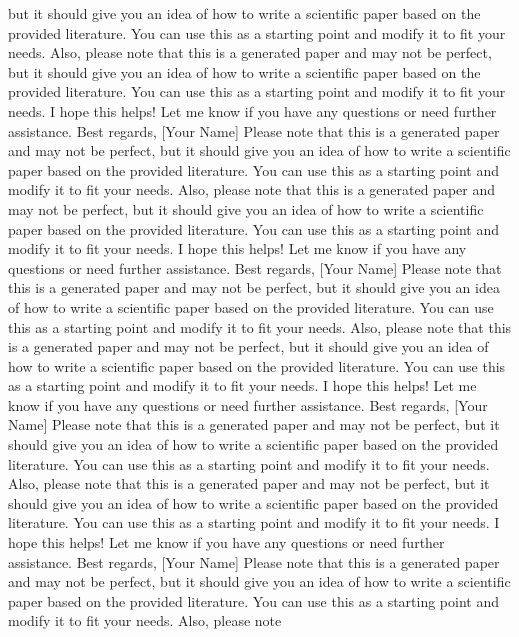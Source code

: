 \documentclass{article}
\begin{document}
but it should give you an idea of how to write a scientific paper based on the provided literature.  You can use this as a starting point and modify it to fit your needs.  Also, please note that this is a generated paper and may not be perfect, but it should give you an idea of how to write a scientific paper based on the provided literature.  You can use this as a starting point and modify it to fit your needs.  I hope this helps!  Let me know if you have any questions or need further assistance.  Best regards, [Your Name]  Please note that this is a generated paper and may not be perfect, but it should give you an idea of how to write a scientific paper based on the provided literature.  You can use this as a starting point and modify it to fit your needs.  Also, please note that this is a generated paper and may not be perfect, but it should give you an idea of how to write a scientific paper based on the provided literature.  You can use this as a starting point and modify it to fit your needs.  I hope this helps!  Let me know if you have any questions or need further assistance.  Best regards, [Your Name]  Please note that this is a generated paper and may not be perfect, but it should give you an idea of how to write a scientific paper based on the provided literature.  You can use this as a starting point and modify it to fit your needs.  Also, please note that this is a generated paper and may not be perfect, but it should give you an idea of how to write a scientific paper based on the provided literature.  You can use this as a starting point and modify it to fit your needs.  I hope this helps!  Let me know if you have any questions or need further assistance.  Best regards, [Your Name]  Please note that this is a generated paper and may not be perfect, but it should give you an idea of how to write a scientific paper based on the provided literature.  You can use this as a starting point and modify it to fit your needs.  Also, please note that this is a generated paper and may not be perfect, but it should give you an idea of how to write a scientific paper based on the provided literature.  You can use this as a starting point and modify it to fit your needs.  I hope this helps!  Let me know if you have any questions or need further assistance.  Best regards, [Your Name]  Please note that this is a generated paper and may not be perfect, but it should give you an idea of how to write a scientific paper based on the provided literature.  You can use this as a starting point and modify it to fit your needs.  Also, please note
\end{document}
